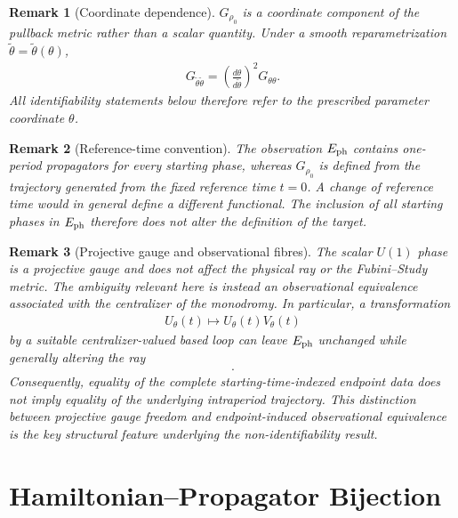 \documentclass[twocolumn,prl,aps,floatfix]{revtex4-2}
\newtheorem{remark}{Remark}
\begin{document}
\begin{remark}[Coordinate dependence]
$G_{\rho_0}$ is a coordinate component of the pullback metric rather than a scalar quantity. Under a smooth reparametrization $\tilde\theta=\tilde\theta(\theta)$,
\begin{align}
G_{\tilde\theta\tilde\theta}
=
\left(
\frac{d\theta}{d\tilde\theta}
\right)^2
G_{\theta\theta}.
\label{eq:coordinate_transform}
\end{align}
All identifiability statements below therefore refer to the prescribed parameter coordinate $\theta$.
\end{remark}

\begin{remark}[Reference-time convention]
The observation $E_{\rm ph}$ contains one-period propagators for every starting phase, whereas $G_{\rho_0}$ is defined from the trajectory generated from the fixed reference time $t=0$. A change of reference time would in general define a different functional. The inclusion of all starting phases in $E_{\rm ph}$ therefore does not alter the definition of the target.
\end{remark}

\begin{remark}[Projective gauge and observational fibres]
The scalar $U(1)$ phase is a projective gauge and does not affect the physical ray or the Fubini--Study metric. The ambiguity relevant here is instead an observational equivalence associated with the centralizer of the monodromy. In particular, a transformation
\begin{align}
U_\theta(t)
\longmapsto
U_\theta(t)V_\theta(t)
\end{align}
by a suitable centralizer-valued based loop can leave $E_{\rm ph}$ unchanged while generally altering the ray
\begin{align}
[U_\theta(t)|\psi_0\rangle].
\end{align}
Consequently, equality of the complete starting-time-indexed endpoint data does not imply equality of the underlying intraperiod trajectory. This distinction between projective gauge freedom and endpoint-induced observational equivalence is the key structural feature underlying the non-identifiability result.
\end{remark}

\section{Hamiltonian--Propagator Bijection}
\end{document}
